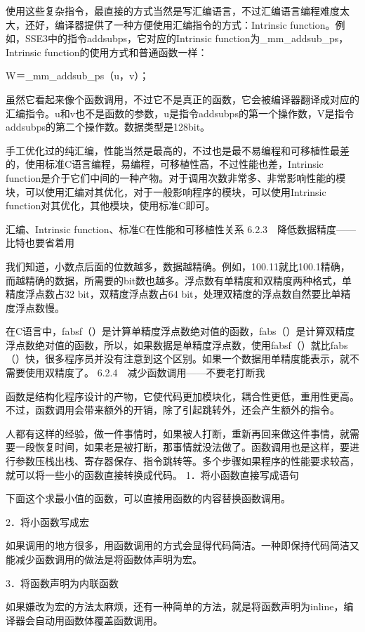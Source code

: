 \documentclass[12pt,UTF8]{ctexbook}
\begin{document}
使用这些复杂指令，最直接的方式当然是写汇编语言，不过汇编语言编程难度太大，还好，编译器提供了一种方便使用汇编指令的方式：Intrinsic function。例如，SSE3中的指令addsubps，它对应的Intrinsic function为\_mm\_addsub\_ps，Intrinsic function的使用方式和普通函数一样：

W＝\_mm\_addsub\_ps（u，v）；

虽然它看起来像个函数调用，不过它不是真正的函数，它会被编译器翻译成对应的汇编指令。u和v也不是函数的参数，u是指令addsubps的第一个操作数，V是指令addsubps的第二个操作数。数据类型是128bit。

手工优化过的纯汇编，性能当然是最高的，不过也是最不易编程和可移植性最差的，使用标准C语言编程，易编程，可移植性高，不过性能也差，Intrinsic function是介于它们中间的一种产物。对于调用次数非常多、非常影响性能的模块，可以使用汇编对其优化，对于一般影响程序的模块，可以使用Intrinsic function对其优化，其他模块，使用标准C即可。

汇编、Intrinsic function、标准C在性能和可移植性关系
6.2.3　降低数据精度——比特也要省着用

我们知道，小数点后面的位数越多，数据越精确。例如，100.11就比100.1精确，而越精确的数据，所需要的bit数也越多。浮点数有单精度和双精度两种格式，单精度浮点数占32 bit，双精度浮点数占64 bit，处理双精度的浮点数自然要比单精度浮点数慢。

在C语言中，fabsf（）是计算单精度浮点数绝对值的函数，fabs（）是计算双精度浮点数绝对值的函数，所以，如果数据是单精度浮点数，使用fabsf（）就比fabs（）快，很多程序员并没有注意到这个区别。如果一个数据用单精度能表示，就不需要使用双精度了。
6.2.4　减少函数调用——不要老打断我

函数是结构化程序设计的产物，它使代码更加模块化，耦合性更低，重用性更高。不过，函数调用会带来额外的开销，除了引起跳转外，还会产生额外的指令。

人都有这样的经验，做一件事情时，如果被人打断，重新再回来做这件事情，就需要一段恢复时间，如果老是被打断，那事情就没法做了。函数调用也是这样，要进行参数压栈出栈、寄存器保存、指令跳转等。多个步骤如果程序的性能要求较高，就可以将一些小的函数直接转换成代码。
1．将小函数直接写成语句

下面这个求最小值的函数，可以直接用函数的内容替换函数调用。

2．将小函数写成宏

如果调用的地方很多，用函数调用的方式会显得代码简洁。一种即保持代码简洁又能减少函数调用的做法是将函数体声明为宏。

3．将函数声明为内联函数

如果嫌改为宏的方法太麻烦，还有一种简单的方法，就是将函数声明为inline，编译器会自动用函数体覆盖函数调用。
\end{document}
